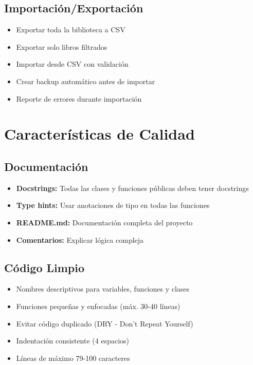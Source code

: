 \documentclass[12pt,a4paper]{article}
\begin{document}
\subsection{Importación/Exportación}
\begin{itemize}[leftmargin=*]
    \item Exportar toda la biblioteca a CSV
    \item Exportar solo libros filtrados
    \item Importar desde CSV con validación
    \item Crear backup automático antes de importar
    \item Reporte de errores durante importación
\end{itemize}

\section{Características de Calidad}

\subsection{Documentación}
\begin{itemize}[leftmargin=*]
    \item \textbf{Docstrings:} Todas las clases y funciones públicas deben tener docstrings
    \item \textbf{Type hints:} Usar anotaciones de tipo en todas las funciones
    \item \textbf{README.md:} Documentación completa del proyecto
    \item \textbf{Comentarios:} Explicar lógica compleja
\end{itemize}

\subsection{Código Limpio}
\begin{itemize}[leftmargin=*]
    \item Nombres descriptivos para variables, funciones y clases
    \item Funciones pequeñas y enfocadas (máx. 30-40 líneas)
    \item Evitar código duplicado (DRY - Don't Repeat Yourself)
    \item Indentación consistente (4 espacios)
    \item Líneas de máximo 79-100 caracteres
\end{itemize}
\end{document}
